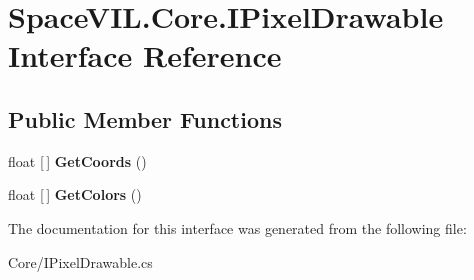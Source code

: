 \hypertarget{interface_space_v_i_l_1_1_core_1_1_i_pixel_drawable}{}\section{Space\+V\+I\+L.\+Core.\+I\+Pixel\+Drawable Interface Reference}
\label{interface_space_v_i_l_1_1_core_1_1_i_pixel_drawable}
\subsection*{Public Member Functions}
\begin{DoxyCompactItemize}
\item 
\mbox{\label{interface_space_v_i_l_1_1_core_1_1_i_pixel_drawable_a562983f91628768f5e43226a82efca37}} 
float \mbox{[}$\,$\mbox{]} {\bfseries Get\+Coords} ()
\item 
\mbox{\label{interface_space_v_i_l_1_1_core_1_1_i_pixel_drawable_a0d95ac06f6d070d201bfa01cd115f2fc}} 
float \mbox{[}$\,$\mbox{]} {\bfseries Get\+Colors} ()
\end{DoxyCompactItemize}


The documentation for this interface was generated from the following file\+:\begin{DoxyCompactItemize}
\item 
Core/I\+Pixel\+Drawable.\+cs\end{DoxyCompactItemize}
